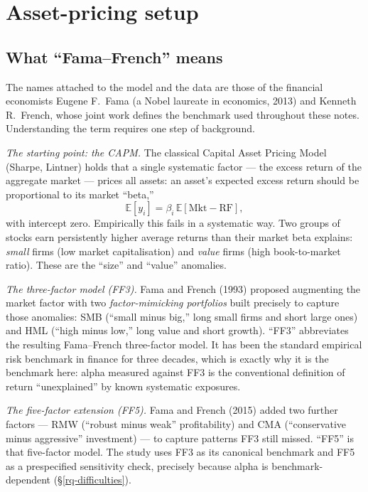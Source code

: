 \section{Asset-pricing setup}\label{prelim-ap}

\subsection{What ``Fama--French'' means}\label{prelim-ff}

The names attached to the model and the data are those of the financial
economists Eugene F.\ Fama (a Nobel laureate in economics, 2013) and
Kenneth R.\ French, whose joint work defines the benchmark used throughout
these notes. Understanding the term requires one step of background.

\emph{The starting point: the CAPM.} The classical Capital Asset Pricing
Model (Sharpe, Lintner) holds that a single systematic factor --- the
excess return of the aggregate market --- prices all assets: an asset's
expected excess return should be proportional to its market ``beta,''
\begin{equation}
\mathbb{E}[y_{i}]=\beta_{i}\,\mathbb{E}[\text{Mkt}-\text{RF}],
\end{equation}
with intercept zero. Empirically this fails in a systematic way. Two
groups of stocks earn persistently higher average returns than their
market beta explains: \emph{small} firms (low market capitalisation) and
\emph{value} firms (high book-to-market ratio). These are the ``size'' and
``value'' anomalies.

\emph{The three-factor model (FF3).} Fama and French (1993) proposed
augmenting the market factor with two \emph{factor-mimicking portfolios}
built precisely to capture those anomalies: SMB (``small minus big,'' long
small firms and short large ones) and HML (``high minus low,'' long value
and short growth). ``FF3'' abbreviates the resulting Fama--French
three-factor model. It has been the standard empirical risk benchmark in
finance for three decades, which is exactly why it is the benchmark here:
alpha measured against FF3 is the conventional definition of return
``unexplained'' by known systematic exposures.

\emph{The five-factor extension (FF5).} Fama and French (2015) added two
further factors --- RMW (``robust minus weak'' profitability) and CMA
(``conservative minus aggressive'' investment) --- to capture patterns FF3
still missed. ``FF5'' is that five-factor model. The study uses FF3 as its
canonical benchmark and FF5 as a prespecified sensitivity check, precisely
because alpha is benchmark-dependent (\S\ref{rq-difficulties}).

